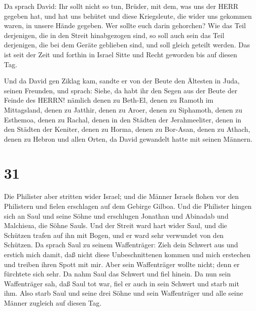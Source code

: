 Da sprach David: Ihr sollt nicht so tun, Brüder, mit dem,
was uns der HERR gegeben hat, und hat uns behütet und diese Kriegsleute,
die wider uns gekommen waren, in unsere Hände gegeben.  Wer
sollte euch darin gehorchen? Wie das Teil derjenigen, die in den Streit
hinabgezogen sind, so soll auch sein das Teil derjenigen, die bei dem
Geräte geblieben sind, und soll gleich geteilt werden.  Das
ist seit der Zeit und forthin in Israel Sitte und Recht geworden bis auf
diesen Tag.

 Und da David gen Ziklag kam, sandte er von der Beute den
Ältesten in Juda, seinen Freunden, und sprach: Siehe, da habt ihr den
Segen aus der Beute der Feinde des HERRN!  nämlich denen zu
Beth-El, denen zu Ramoth im Mittagsland, denen zu Jatthir, 
denen zu Aroer, denen zu Siphamoth, denen zu Esthemoa, 
denen zu Rachal, denen in den Städten der Jerahmeeliter, denen in den
Städten der Keniter,  denen zu Horma, denen zu Bor-Asan,
denen zu Athach,  denen zu Hebron und allen Orten, da David
gewandelt hatte mit seinen Männern.

\hypertarget{section-30}{%
\section{31}\label{section-30}}

 Die Philister aber stritten wider Israel; und die Männer
Israels flohen vor den Philistern und fielen erschlagen auf dem Gebirge
Gilboa.  Und die Philister hingen sich an Saul und seine
Söhne und erschlugen Jonathan und Abinadab und Malchisua, die Söhne
Sauls.  Und der Streit ward hart wider Saul, und die
Schützen trafen auf ihn mit Bogen, und er ward sehr verwundet von den
Schützen.  Da sprach Saul zu seinem Waffenträger: Zieh dein
Schwert aus und erstich mich damit, daß nicht diese Unbeschnittenen
kommen und mich erstechen und treiben ihren Spott mit mir. Aber sein
Waffenträger wollte nicht; denn er fürchtete sich sehr. Da nahm Saul das
Schwert und fiel hinein.  Da nun sein Waffenträger sah, daß
Saul tot war, fiel er auch in sein Schwert und starb mit ihm.
 Also starb Saul und seine drei Söhne und sein Waffenträger
und alle seine Männer zugleich auf diesen Tag.


